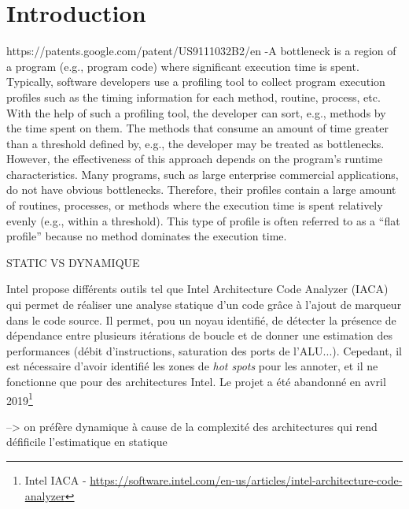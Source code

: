 \section{Introduction}\label{sec:edl_perf_intro}

 
https://patents.google.com/patent/US9111032B2/en  
    -A bottleneck is a region of a program (e.g., program code) where significant execution time is spent. Typically, software developers use a profiling tool to collect program execution profiles such as the timing information for each method, routine, process, etc. With the help of such a profiling tool, the developer can sort, e.g., methods by the time spent on them. The methods that consume an amount of time greater than a threshold defined by, e.g., the developer may be treated as bottlenecks. However, the effectiveness of this approach depends on the program's runtime characteristics. Many programs, such as large enterprise commercial applications, do not have obvious bottlenecks. Therefore, their profiles contain a large amount of routines, processes, or methods where the execution time is spent relatively evenly (e.g., within a threshold). This type of profile is often referred to as a “flat profile” because no method dominates the execution time.
    


STATIC VS DYNAMIQUE

Intel propose différents outils tel que Intel Architecture Code Analyzer (IACA) \cite{Hirsh2012} qui permet de réaliser une analyse statique d'un code grâce à l'ajout de marqueur dans le code source. Il permet, pou un noyau identifié, de détecter la présence de dépendance entre plusieurs itérations de boucle et de donner une estimation des performances (débit d'instructions, saturation des ports de l'ALU...). Cepedant, il est nécessaire d'avoir identifié les zones de \textit{hot spots} pour les annoter, et il ne fonctionne que pour des architectures Intel. Le projet a été abandonné en avril 2019\footnote{Intel IACA - \url{https://software.intel.com/en-us/articles/intel-architecture-code-analyzer}}

--> on préfère dynamique à cause de la complexité des architectures qui rend défificile l'estimatique en statique
